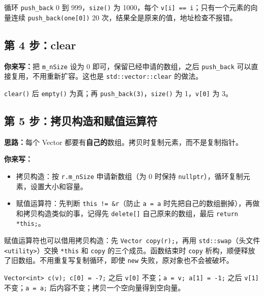\documentclass[11pt,a4paper]{article}
\newcommand{\code}[1]{\texttt{#1}}
\newcommand{\idea}{\textbf{思路：}}
\newcommand{\todo}{\textbf{你来写：}}
\begin{document}
\begin{done}
循环 \code{push\_back} 0 到 999，\code{size()} 为 1000，每个 \code{v[i] == i}；只有一个元素的向量连续 \code{push\_back(one[0])} 20 次，结果全是原来的值，地址检查不报错。
\end{done}

\subsection{第 4 步：clear}

\todo 把 \code{m\_nSize} 设为 0 即可，保留已经申请的数组，之后 \code{push\_back} 可以直接复用，不用重新扩容。这也是 \code{std::vector::clear} 的做法。

\begin{done}
\code{clear()} 后 \code{empty()} 为真；再 \code{push\_back(3)}，\code{size()} 为 1，\code{v[0]} 为 3。
\end{done}

\subsection{第 5 步：拷贝构造和赋值运算符}

\idea 每个 Vector 都要有\textbf{自己的}数组。拷贝时复制元素，而不是复制指针。

\todo
\begin{itemize}
  \item 拷贝构造：按 \code{r.m\_nSize} 申请新数组（为 0 时保持 \code{nullptr}），循环复制元素，设置大小和容量。
  \item 赋值运算符：先判断 \code{this != \&r}（防止 \code{a = a} 时先把自己的数组删掉），再做和拷贝构造类似的事，记得先 \code{delete[]} 自己原来的数组，最后 \code{return *this;}。
\end{itemize}

\begin{tip}
赋值运算符也可以借用拷贝构造：先 \code{Vector copy(r);}，再用 \code{std::swap}（头文件 \code{<utility>}）交换 \code{*this} 和 \code{copy} 的三个成员。函数结束时 \code{copy} 析构，顺便释放了旧数组。不用重复写复制循环，即使 \code{new} 失败，原对象也不会被破坏。
\end{tip}

\begin{done}
\code{Vector<int> c(v); c[0] = -7;} 之后 \code{v[0]} 不变；\code{a = v; a[1] = -1;} 之后 \code{v[1]} 不变；\code{a = a;} 后内容不变；拷贝一个空向量得到空向量。
\end{done}
\end{document}

